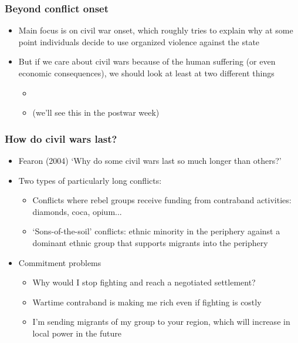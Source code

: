 \documentclass[aspectratio=43]{beamer}
\begin{document}
\begin{frame}
\frametitle{Beyond conflict onset}
\centering

\begin{itemize}
  \item Main focus is on civil war onset, which roughly tries to explain why at some point individuals decide to use organized violence against the state
  \item But if we care about civil wars because of the human suffering (or even economic consequences), we should look at least at two different things
  \begin{itemize}
    \item {}
    \item {} (we'll see this in the postwar week)
  \end{itemize}
\end{itemize}

\end{frame}



\begin{frame}
\frametitle{How  do civil wars last?}
\centering

\begin{itemize}
  \item Fearon (2004) `Why do some civil wars last so much longer than others?'
  \item Two types of particularly long conflicts:
  \begin{itemize}
    \item Conflicts where rebel groups receive funding from contraband activities: diamonds, coca, opium...
    \item `Sons-of-the-soil' conflicts: ethnic minority in the periphery against a dominant ethnic group that supports migrants into the periphery
  \end{itemize}
  \item<2-> Commitment problems
  \begin{itemize}
    \item Why would I stop fighting and reach a negotiated settlement?
    \item Wartime contraband is making me rich even if fighting is costly
    \item I'm sending migrants of my group to your region, which will increase in local power in the future
  \end{itemize}
\end{itemize}

\end{frame}
\end{document}

